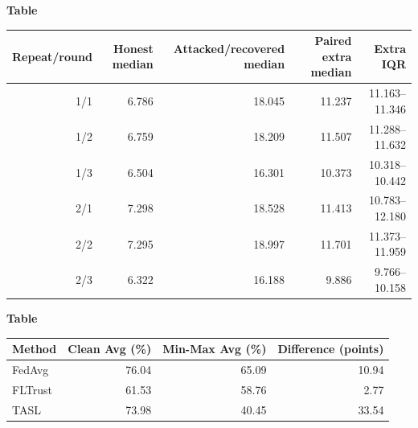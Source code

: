 \noindent\begin{minipage}{\textwidth}
\label{tab:local_recovery_cost}
\textbf{Table~\thetable}\\
\par\smallskip\centering\small
\setlength{\tabcolsep}{5pt}
\begin{tabular}{rrrrr}
\toprule
Repeat/round & Honest median & Attacked/recovered median & Paired extra median & Extra IQR \\
\midrule
1/1 & 6.786 & 18.045 & 11.237 & 11.163--11.346 \\
1/2 & 6.759 & 18.209 & 11.507 & 11.288--11.632 \\
1/3 & 6.504 & 16.301 & 10.373 & 10.318--10.442 \\
2/1 & 7.298 & 18.528 & 11.413 & 10.783--12.180 \\
2/2 & 7.295 & 18.997 & 11.701 & 11.373--11.959 \\
2/3 & 6.322 & 16.188 & 9.886 & 9.766--10.158 \\
\bottomrule
\end{tabular}
\end{minipage}

\noindent\begin{minipage}{\textwidth}
\label{tab:minmax_stress}
\textbf{Table~\thetable}\\
\par\smallskip\centering\small
\setlength{\tabcolsep}{7pt}
\begin{tabular}{lrrr}
\toprule
Method & Clean Avg (\%) & Min-Max Avg (\%) & Difference (points) \\
\midrule
FedAvg & 76.04 & 65.09 & 10.94 \\
FLTrust & 61.53 & 58.76 & 2.77 \\
TASL & 73.98 & 40.45 & 33.54 \\
\bottomrule
\end{tabular}
\end{minipage}

